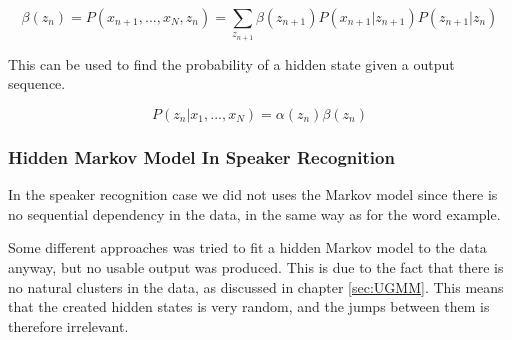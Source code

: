 \begin{equation}
	\beta(z_n) = P(x_{n+1}, ..., x_N, z_n) = \sum\limits_{z_{n+1}} \beta(z_{n+1}) P(x_{n+1}|z_{n+1}) P(z_{n+1}| z_n)
\end{equation}

This can be used to find the probability of a hidden state given a output sequence. 

\begin{equation}
	P(z_n|x_1, ..., x_N) = \alpha(z_n) \beta(z_n)
\end{equation}

\subsubsection{Hidden Markov Model In Speaker Recognition}
In the speaker recognition case we did not uses the Markov model since there is no sequential dependency in the data, in the same way as for the word example. 

Some different approaches was tried to fit a hidden Markov model to the data anyway, but no usable output was produced. This is due to the fact that there is no natural clusters in the data, as discussed in chapter \ref{sec:UGMM}. This means that the created hidden states is very random, and the jumps between them is therefore irrelevant. 